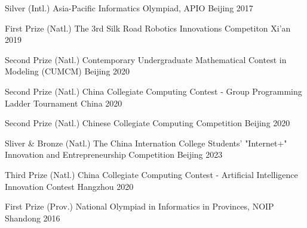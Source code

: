\begin{cvhonors}

\cvhonor
{Silver} %
{(Intl.) Asia-Pacific Informatics Olympiad, APIO} %
{Beijing} %
{2017} %

\cvhonor
{First Prize} %
{(Natl.) The 3rd Silk Road Robotics Innovations Competiton} %
{Xi'an} %
{2019} %

\cvhonor
{Second Prize} %
{(Natl.) Contemporary Undergraduate Mathematical Contest in Modeling (CUMCM)} %
{Beijing} %
{2020} %

\cvhonor
{Second Prize} %
{(Natl.) China Collegiate Computing Contest - Group Programming Ladder Tournament} %
{China} %
{2020} %


\cvhonor
{Second Prize} %
{(Natl.) Chinese Collegiate Computing Competition} %
{Beijing} %
{2020} %


\cvhonor
{Sliver \& Bronze} %
{(Natl.) The China Internation College Students' "Internet+" Innovation and Entrepreneurship Competition} %
{Beijing} %
{2023} %

\cvhonor
{Third Prize} %
{(Natl.) China Collegiate Computing Contest - Artificial Intelligence Innovation Contest} %
{Hangzhou} %
{2020} %






\cvhonor
{First Prize} %
{(Prov.) National Olympiad in Informatics in Provinces, NOIP} %
{Shandong} %
{2016} %


\end{cvhonors}

